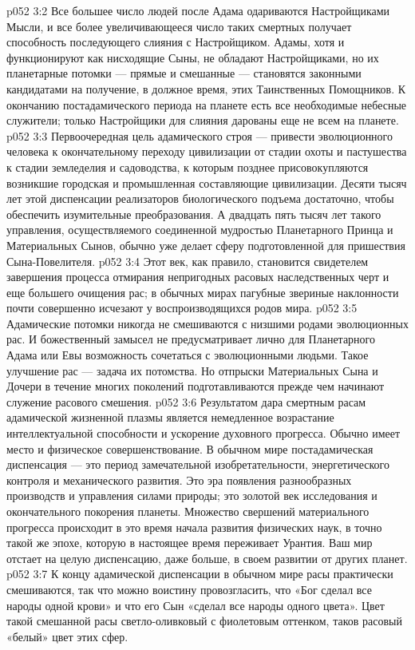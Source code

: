 \vs p052 3:2 Все большее число людей после Адама одариваются Настройщиками Мысли, и все более увеличивающееся число таких смертных получает способность последующего слияния с Настройщиком. Адамы, хотя и функционируют как нисходящие Сыны, не обладают Настройщиками, но их планетарные потомки --- прямые и смешанные --- становятся законными кандидатами на получение, в должное время, этих Таинственных Помощников. К окончанию постадамического периода на планете есть все необходимые небесные служители; только Настройщики для слияния дарованы еще не всем на планете.
\vs p052 3:3 \pc Первоочередная цель адамического строя --- привести эволюционного человека к окончательному переходу цивилизации от стадии охоты и пастушества к стадии земледелия и садоводства, к которым позднее присовокупляются возникшие городская и промышленная составляющие цивилизации. Десяти тысяч лет этой диспенсации реализаторов биологического подъема достаточно, чтобы обеспечить изумительные преобразования. А двадцать пять тысяч лет такого управления, осуществляемого соединенной мудростью Планетарного Принца и Материальных Сынов, обычно уже делает сферу подготовленной для пришествия Сына\hyp{}Повелителя.
\vs p052 3:4 \pc Этот век, как правило, становится свидетелем завершения процесса отмирания непригодных расовых наследственных черт и еще большего очищения рас; в обычных мирах пагубные звериные наклонности почти совершенно исчезают у воспроизводящихся родов мира.
\vs p052 3:5 Адамические потомки никогда не смешиваются с низшими родами эволюционных рас. И божественный замысел не предусматривает лично для Планетарного Адама или Евы возможность сочетаться с эволюционными людьми. Такое улучшение рас --- задача их потомства. Но отпрыски Материальных Сына и Дочери в течение многих поколений подготавливаются прежде чем начинают служение расового смешения.
\vs p052 3:6 Результатом дара смертным расам адамической жизненной плазмы является немедленное возрастание интеллектуальной способности и ускорение духовного прогресса. Обычно имеет место и физическое совершенствование. В обычном мире постадамическая диспенсация --- это период замечательной изобретательности, энергетического контроля и механического развития. Это эра появления разнообразных производств и управления силами природы; это золотой век исследования и окончательного покорения планеты. Множество свершений материального прогресса происходит в это время начала развития физических наук, в точно такой же эпохе, которую в настоящее время переживает Урантия. Ваш мир отстает на целую диспенсацию, даже больше, в своем развитии от других планет.
\vs p052 3:7 К концу адамической диспенсации в обычном мире расы практически смешиваются, так что можно воистину провозгласить, что «Бог сделал все народы одной крови» и что его Сын «сделал все народы одного цвета». Цвет такой смешанной расы светло\hyp{}оливковый с фиолетовым оттенком, таков расовый «белый» цвет этих сфер.
